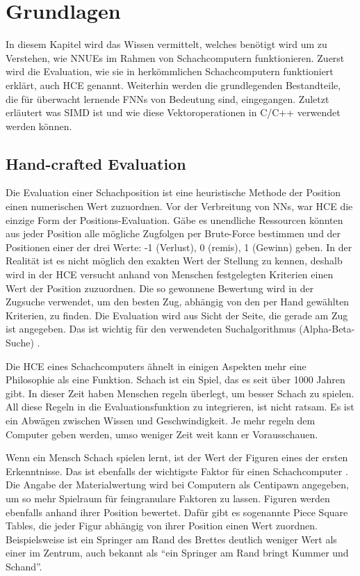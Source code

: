 \chapter{Grundlagen}

In diesem Kapitel wird das Wissen vermittelt, welches benötigt wird um zu Verstehen, wie \acp{NNUE} im Rahmen von Schachcomputern funktionieren. Zuerst wird die Evaluation, wie sie in herkömmlichen Schachcomputern funktioniert erklärt, auch \ac{HCE} genannt. Weiterhin werden die grundlegenden Bestandteile, die für überwacht lernende \acp{FNN} von Bedeutung sind, eingegangen. Zuletzt erläutert was \ac{SIMD} ist und wie diese Vektoroperationen in C/C++ verwendet werden können.

\section{Hand-crafted Evaluation}
\label{chap:HCE}

Die Evaluation einer Schachposition ist eine heuristische Methode der Position einen numerischen Wert zuzuordnen. Vor der Verbreitung von \acp{NN}, war \ac{HCE} die einzige Form der Positions-Evaluation. Gäbe es unendliche Ressourcen könnten aus jeder Position alle mögliche Zugfolgen per Brute-Force bestimmen und der Positionen einer der drei Werte: -1 (Verlust), 0 (remis), 1 (Gewinn) geben. In der Realität ist es nicht möglich den exakten Wert der Stellung zu kennen, deshalb wird in der \ac{HCE} versucht anhand von Menschen festgelegten Kriterien einen Wert der Position zuzuordnen. Die so gewonnene Bewertung wird in der Zugsuche verwendet, um den besten Zug, abhängig von den per Hand gewählten Kriterien, zu finden. Die Evaluation wird aus Sicht der Seite, die gerade am Zug ist angegeben. Das ist wichtig für den verwendeten Suchalgorithmus (Alpha-Beta-Suche) \cite{Slagle1969}.

Die \ac{HCE} eines Schachcomputers ähnelt in einigen Aspekten mehr eine Philosophie als eine Funktion. Schach ist ein Spiel, das es seit über 1000 Jahren gibt. In dieser Zeit haben Menschen regeln überlegt, um besser Schach zu spielen. All diese Regeln in die Evaluationsfunktion zu integrieren, ist nicht ratsam. Es ist ein Abwägen zwischen Wissen und Geschwindigkeit. Je mehr regeln dem Computer geben werden, umso weniger Zeit weit kann er Vorausschauen.

Wenn ein Mensch Schach spielen lernt, ist der Wert der Figuren eines der ersten Erkenntnisse. Das ist ebenfalls der wichtigste Faktor für einen Schachcomputer \cite{Levy1988}. Die Angabe der Materialwertung wird bei Computern als Centipawn angegeben, um so mehr Spielraum für feingranulare Faktoren zu lassen. Figuren werden ebenfalls anhand ihrer Position bewertet. Dafür gibt es sogenannte Piece Square Tables, die jeder Figur abhängig von ihrer Position einen Wert zuordnen. Beispielsweise ist ein Springer am Rand des Brettes deutlich weniger Wert als einer im Zentrum, auch bekannt als \enquote{ein Springer am Rand bringt Kummer und Schand}.

